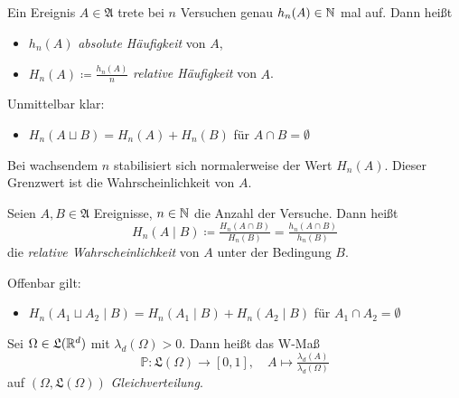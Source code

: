 \documentclass{cheat-sheet}
\newcommand{\Alg}{\mathfrak{A}} %
\newcommand{\LebAlg}{\mathfrak{L}} %
\renewcommand{\P}{\mathbb{P}} %
\begin{document}

\begin{defn}
  Ein Ereignis $A \in \Alg$ trete bei $n$ Versuchen genau $h_n(A) \in \mathbb{N}$ mal auf. Dann heißt
  \begin{itemize}
    \item $h_n(A)$ \emph{absolute Häufigkeit} von $A$,
    \item $H_n(A) \coloneqq \tfrac{h_n(A)}{n}$ \emph{relative Häufigkeit} von $A$.
  \end{itemize}
\end{defn}

\begin{bem}
  Unmittelbar klar:
  \begin{itemize}
    \item $H_n(A \sqcup B) = H_n(A) + H_n(B)$ für $A \cap B = \emptyset$
  \end{itemize}
\end{bem}

\begin{bem}
  Bei wachsendem $n$ stabilisiert sich normalerweise der Wert $H_n(A)$. Dieser Grenzwert ist die Wahrscheinlichkeit von $A$.
\end{bem}



\begin{defn}
  Seien $A, B \in \Alg$ Ereignisse, $n \in \mathbb{N}$ die Anzahl der Versuche. Dann heißt
  \[ H_n(A \mid B) \coloneqq \tfrac{H_n(A \cap B)}{H_n(B)} = \tfrac{h_n(A \cap B)}{h_n(B)} \]
  die \emph{relative Wahrscheinlichkeit} von $A$ unter der Bedingung $B$.
\end{defn}

\begin{bem}
  Offenbar gilt:
  \begin{itemize}
    \item $H_n(A_1 \sqcup A_2 \mid B) = H_n(A_1 \mid B) + H_n(A_2 \mid B)$ für $A_1 \cap A_2 = \emptyset$
  \end{itemize}
\end{bem}


\begin{defn}
  Sei $\Omega \in \LebAlg(\R^d)$ mit $\lambda_d(\Omega) > 0$. Dann heißt das W-Maß
  \[ \P : \LebAlg(\Omega) \to [0, 1], \quad A \mapsto \tfrac{\lambda_d(A)}{\lambda_d(\Omega)} \]
  auf $(\Omega, \LebAlg(\Omega))$ \emph{Gleichverteilung}.
\end{defn}
\end{document}
